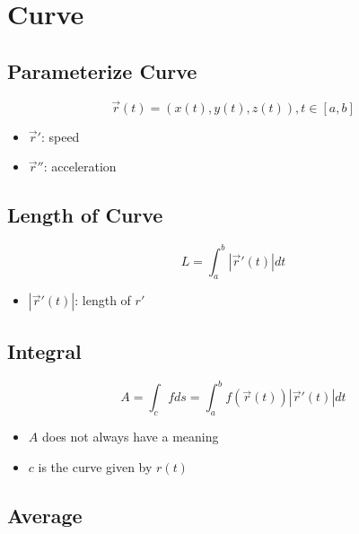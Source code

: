\section{Curve}

  \subsection{Parameterize Curve}

    \begin{equation}
      \vec{r}\left( t \right) = \left( x(t), y(t), z(t) \right), t \in \left[ a, b \right]
    \end{equation}

    \begin{itemize}
      \item $ \vec{r}' $: speed
      \item $ \vec{r}'' $: acceleration
    \end{itemize}

  \subsection{Length of Curve}

    \begin{equation}
      L = \int_{a}^{b} \left| \vec{r}'\left( t \right) \right| dt
    \end{equation}

    \begin{itemize}
      \item $ \left| \vec{r}'\left( t \right) \right| $: length of $ r' $
    \end{itemize}

  \subsection{Integral}

    \begin{equation}
      A = \int_{c} fds = \int_{a}^{b} f\left( \vec{r}(t) \right) \left| \vec{r}'(t) \right| dt
    \end{equation}

    \begin{itemize}
      \item $ A $ does not always have a meaning
      \item $ c $ is the curve given by $ r\left( t \right) $
    \end{itemize}

  \subsection{Average}

